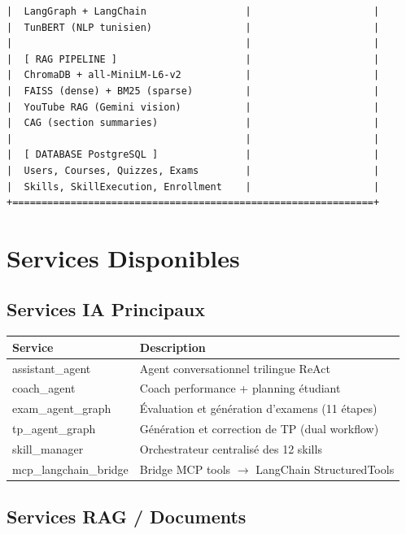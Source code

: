 \documentclass[12pt,a4paper]{article}
\begin{document}
\begin{lstlisting}[basicstyle=\ttfamily\scriptsize]
|  LangGraph + LangChain                 |                     |
|  TunBERT (NLP tunisien)                |                     |
|                                        |                     |
|  [ RAG PIPELINE ]                      |                     |
|  ChromaDB + all-MiniLM-L6-v2           |                     |
|  FAISS (dense) + BM25 (sparse)         |                     |
|  YouTube RAG (Gemini vision)           |                     |
|  CAG (section summaries)               |                     |
|                                        |                     |
|  [ DATABASE PostgreSQL ]               |                     |
|  Users, Courses, Quizzes, Exams        |                     |
|  Skills, SkillExecution, Enrollment    |                     |
+==============================================================+
\end{lstlisting}

\section{Services Disponibles}

\subsection{Services IA Principaux}

\begin{longtable}{lp{9cm}}
\toprule
\textbf{Service} & \textbf{Description} \\
\midrule
assistant\_agent & Agent conversationnel trilingue ReAct \\
coach\_agent & Coach performance + planning étudiant \\
exam\_agent\_graph & Évaluation et génération d'examens (11 étapes) \\
tp\_agent\_graph & Génération et correction de TP (dual workflow) \\
skill\_manager & Orchestrateur centralisé des 12 skills \\
mcp\_langchain\_bridge & Bridge MCP tools $\to$ LangChain StructuredTools \\
\bottomrule
\end{longtable}

\subsection{Services RAG / Documents}
\end{document}
